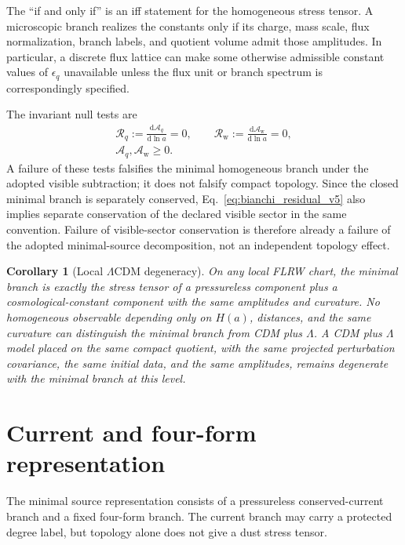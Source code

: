 \documentclass[
  aps,
  prd,
  reprint,
  superscriptaddress,
  floatfix,
  nofootinbib,
  longbibliography
]{revtex4-2}
\theoremstyle{plain}
\newtheorem{corollary}[theorem]{Corollary}
\theoremstyle{definition}
\theoremstyle{remark}
\newcommand{\dd}{\mathrm d}
\newcommand{\wind}{\mathrm w}
\newcommand{\Aq}{\mathcal A_q}
\newcommand{\Aw}{\mathcal A_{\mathrm w}}
\newcommand{\Rcl}{\mathcal R}
\newcommand{\eps}{\epsilon}
\newcommand{\LCDM}{\Lambda\mathrm{CDM}}
\begin{document}
The ``if and only if'' is an iff statement for the homogeneous stress tensor.
A microscopic branch realizes the constants only if its charge, mass scale,
flux normalization, branch labels, and quotient volume admit those amplitudes.
In particular, a discrete flux lattice can make some otherwise admissible
constant values of \(\eps_q\) unavailable unless the flux unit or branch
spectrum is correspondingly specified.

The invariant null tests are
\begin{equation}
\begin{gathered}
\Rcl_q:=\frac{\dd\Aq}{\dd\ln a}=0,
\qquad
\Rcl_{\wind}:=\frac{\dd\Aw}{\dd\ln a}=0,\\
\Aq,\Aw\ge0 .
\end{gathered}
\label{eq:null_tests_v5}
\end{equation}
A failure of these tests falsifies the minimal homogeneous branch under the
adopted visible subtraction; it does not falsify compact topology.  Since the
closed minimal branch is separately conserved, Eq.~\eqref{eq:bianchi_residual_v5}
also implies separate conservation of the declared visible sector in the same
convention.  Failure of visible-sector conservation is therefore already a
failure of the adopted minimal-source decomposition, not an independent
topology effect.

\begin{corollary}[Local \(\LCDM\) degeneracy]
On any local FLRW chart, the minimal branch is exactly the stress tensor of a
pressureless component plus a cosmological-constant component with the same
amplitudes and curvature.  No homogeneous observable depending only on
\(H(a)\), distances, and the same curvature can distinguish the minimal branch
from CDM plus \(\Lambda\).  A CDM plus \(\Lambda\) model placed on the same
compact quotient, with the same projected perturbation covariance, the same
initial data, and the same amplitudes, remains degenerate with the minimal
branch at this level.
\end{corollary}

\section{Current and four-form representation}

The minimal source representation consists of a pressureless conserved-current
branch and a fixed four-form branch.  The current branch may carry a protected
degree label, but topology alone does not give a dust stress tensor.
\end{document}
